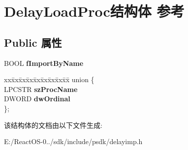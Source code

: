 \hypertarget{struct_delay_load_proc}{}\section{Delay\+Load\+Proc结构体 参考}
\label{struct_delay_load_proc}
\subsection*{Public 属性}
\begin{DoxyCompactItemize}
\item 
\mbox{\label{struct_delay_load_proc_a11b1ff17831668291fceeedebff6f6b2}} 
B\+O\+OL {\bfseries f\+Import\+By\+Name}
\item 
\mbox{\label{struct_delay_load_proc_ae4453d28db69493189432fa1d759f8e8}} 
\begin{tabbing}
xx\=xx\=xx\=xx\=xx\=xx\=xx\=xx\=xx\=\kill
union \{\\
\>LPCSTR {\bfseries szProcName}\\
\>DWORD {\bfseries dwOrdinal}\\
\}; \\

\end{tabbing}\end{DoxyCompactItemize}


该结构体的文档由以下文件生成\+:\begin{DoxyCompactItemize}
\item 
E\+:/\+React\+O\+S-\/0../sdk/include/psdk/delayimp.\+h\end{DoxyCompactItemize}

